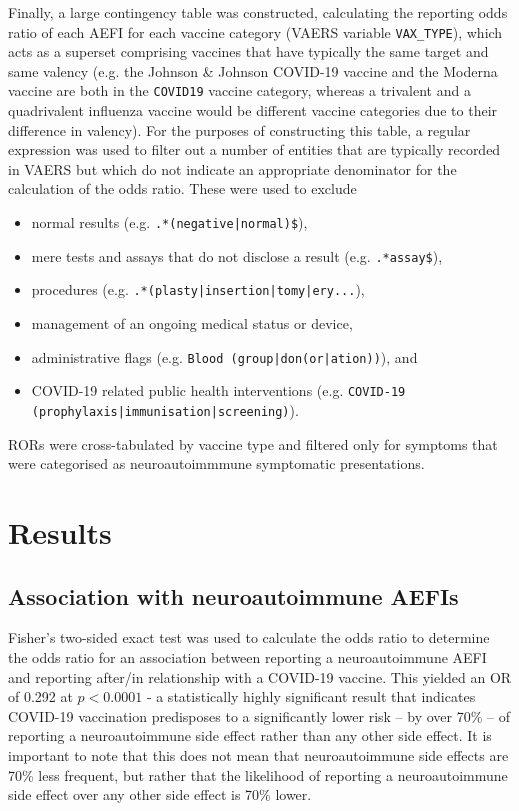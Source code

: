 \documentclass[idr,communication,submit,oneauthor,pdftex]{Definitions/mdpi}
\begin{document}
Finally, a large contingency table was constructed, calculating the reporting odds ratio of each AEFI for each vaccine
category (VAERS variable \texttt{VAX\_TYPE}), which acts as a superset comprising vaccines that have typically the same
target and same valency (e.g. the Johnson \& Johnson COVID-19 vaccine and the Moderna vaccine are both in the
\texttt{COVID19} vaccine category, whereas a trivalent and a quadrivalent influenza vaccine would be different vaccine
categories due to their difference in valency). For the purposes of constructing this table, a regular expression was
used to filter out a number of entities that are typically recorded in VAERS but which do not indicate an appropriate
denominator for the calculation of the odds ratio. These were used to exclude

\begin{itemize}
    \item normal results (e.g. \texttt{.*(negative|normal)\$}),
    \item mere tests and assays that do not disclose a result (e.g. \texttt{.*assay\$}),
    \item procedures (e.g. \texttt{.*(plasty|insertion|tomy|ery...}),
    \item management of an ongoing medical status or device,
    \item administrative flags (e.g. \texttt{Blood (group|don(or|ation))}), and
    \item COVID-19 related public health interventions (e.g. \texttt{COVID-19 \\ (prophylaxis|immunisation|screening)}).
\end{itemize}

RORs were cross-tabulated by vaccine type and filtered only for symptoms that were categorised as neuroautoimmmune
symptomatic presentations.

\section{Results}

\subsection{Association with neuroautoimmune AEFIs}

Fisher's two-sided exact test was used to calculate the odds ratio to determine the odds ratio for an association
between reporting a neuroautoimmune AEFI and reporting after/in relationship with a COVID-19 vaccine. This yielded an
OR of 0.292 at $p < 0.0001$ - a statistically highly significant result that indicates COVID-19 vaccination predisposes
to a significantly lower risk – by over 70\% – of reporting a neuroautoimmune side effect rather than any other side
effect. It is important to note that this does not mean that neuroautoimmune side effects are 70\% less frequent, but
rather that the likelihood of reporting a neuroautoimmune side effect over any other side effect is 70\% lower.
\end{document}
